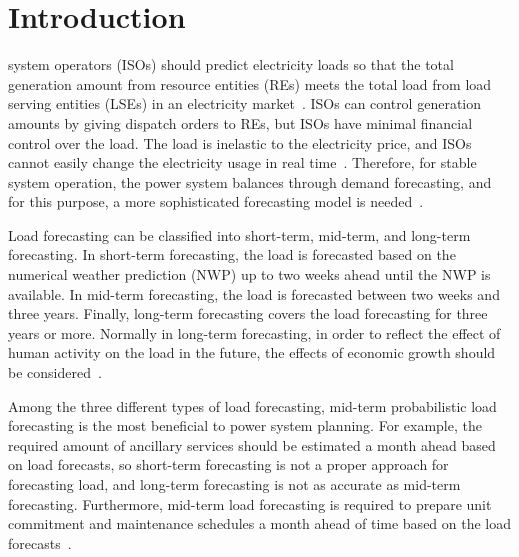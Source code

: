 \documentclass[journal]{IEEEtran} %
\begin{document}



\section{Introduction}
 system operators (ISOs) should predict electricity loads so that the total generation amount from resource entities (REs) meets the total load from load serving entities (LSEs) in an electricity market~\cite{chen2009short}. ISOs can control generation amounts by giving dispatch orders to REs, but ISOs have minimal financial control over the load. The load is inelastic to the electricity price, and ISOs cannot easily change the electricity usage in real time~\cite{Kirschen}. Therefore, for stable system operation, the power system balances through demand forecasting, and for this purpose, a more sophisticated forecasting model is needed~\cite{76685}.


Load forecasting can be classified into short-term, mid-term, and long-term forecasting. In short-term forecasting, the load is forecasted based on the numerical weather prediction (NWP) up to two weeks ahead until the NWP is available. In mid-term forecasting, the load is forecasted between two weeks and three years. Finally, long-term forecasting covers the load forecasting for three years or more. Normally in long-term forecasting, in order to reflect the effect of human activity on the load in the future, the effects of economic growth should be considered~\cite{Tao2014}. 


Among the three different types of load forecasting, mid-term probabilistic load forecasting is the most beneficial to power system planning. For example, the required amount of ancillary services should be estimated a month ahead based on load forecasts, so short-term forecasting is not a proper approach for forecasting load, and long-term forecasting is not as accurate as mid-term forecasting. Furthermore, mid-term load forecasting is required to prepare unit commitment and maintenance schedules a month ahead of time based on the load forecasts~\cite{burger2014managing}.
\end{document}
